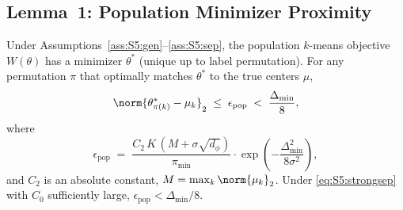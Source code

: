 \subsection{Lemma~1: Population Minimizer Proximity}
\label{sec:S5:lem1}

\begin{lemma}
\label{lem:S5:pop}
Under Assumptions~\ref{ass:S5:gen}--\ref{ass:S5:sep}, the population
$k$-means objective $W(\theta)$ has a minimizer $\theta^*$ (unique up
to label permutation).  For any permutation $\pi$ that optimally matches
$\theta^*$ to the true centers $\mu$,
\[
\norm{\theta^*_{\pi(k)}-\muk}_2 \;\le\; \epsilon_{\mathrm{pop}}
\;<\; \frac{\Delta_{\min}}{8},
\]
where
\[
\epsilon_{\mathrm{pop}} \;=\;
\frac{C_2\,K\,(M+\sigma\sqrt{d_\phi})}{\pi_{\min}}
\cdot \exp\!\left(-\frac{\Delta_{\min}^2}{8\sigma^2}\right),
\]
and $C_2$ is an absolute constant, $M=\max_k\norm{\muk}_2$.
Under \eqref{eq:S5:strongsep} with $C_0$ sufficiently large,
$\epsilon_{\mathrm{pop}}<\Delta_{\min}/8$.
\end{lemma}


